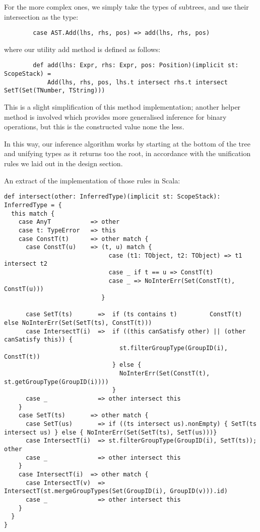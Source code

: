 \documentclass[british, twoside]{bhamthesis}
\theoremstyle{definition}
\begin{document}
      For the more complex ones, we simply take the types of subtrees, and use their intersection as the type:

      \begin{lstlisting}
        case AST.Add(lhs, rhs, pos) => add(lhs, rhs, pos)
      \end{lstlisting}

      where our utility add method is defined as follows:

      \begin{lstlisting}
        def add(lhs: Expr, rhs: Expr, pos: Position)(implicit st: ScopeStack) =
            Add(lhs, rhs, pos, lhs.t intersect rhs.t intersect SetT(Set(TNumber, TString)))
      \end{lstlisting}

      This is a slight simplification of this method implementation; another helper method is involved which provides more generalised inference for binary operations, but this is the constructed value none the less.

      In this way, our inference algorithm works by starting at the bottom of the tree and unifying types as it returns too the root, in accordance with the unification rules we laid out in the design section.

      An extract of the implementation of those rules in Scala:

      \begin{lstlisting}
def intersect(other: InferredType)(implicit st: ScopeStack): InferredType = {
  this match {
    case AnyT           => other
    case t: TypeError   => this
    case ConstT(t)      => other match {
      case ConstT(u)    => (t, u) match {
                             case (t1: TObject, t2: TObject) => t1 intersect t2
                             case _ if t == u => ConstT(t)
                             case _ => NoInterErr(Set(ConstT(t), ConstT(u)))
                           }

      case SetT(ts)       =>  if (ts contains t)         ConstT(t) else NoInterErr(Set(SetT(ts), ConstT(t)))
      case IntersectT(i)  =>  if ((this canSatisfy other) || (other canSatisfy this)) {
                                st.filterGroupType(GroupID(i), ConstT(t))
                              } else {
                                NoInterErr(Set(ConstT(t), st.getGroupType(GroupID(i))))
                              }
      case _              => other intersect this
    }
    case SetT(ts)       => other match {
      case SetT(us)       => if ((ts intersect us).nonEmpty) { SetT(ts intersect us) } else { NoInterErr(Set(SetT(ts), SetT(us)))}
      case IntersectT(i)  => st.filterGroupType(GroupID(i), SetT(ts)); other
      case _              => other intersect this
    }
    case IntersectT(i)  => other match {
      case IntersectT(v)  => IntersectT(st.mergeGroupTypes(Set(GroupID(i), GroupID(v))).id)
      case _              => other intersect this
    }
  }
}
      \end{lstlisting}
\end{document}
